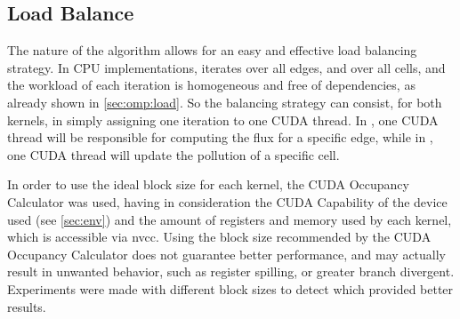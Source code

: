 \subsection{Load Balance}
\label{subsec:cuda:load}


The nature of the algorithm allows for an easy and effective load balancing strategy.
In CPU implementations, \computeflux iterates over all edges, and \update over all cells, and the workload of each iteration is homogeneous and free of dependencies, as already shown in \cref{sec:omp:load}.
So the balancing strategy can consist, for both kernels, in simply assigning one iteration to one CUDA thread.
In \computeflux, one CUDA thread will be responsible for computing the flux for a specific edge, while in \update, one CUDA thread will update the pollution of a specific cell.

In order to use the ideal block size for each kernel, the CUDA Occupancy Calculator \cite{cuda_documentation} was used, having in consideration the CUDA Capability of the device used (see \cref{sec:env}) and the amount of registers and memory used by each kernel, which is accessible via nvcc.
Using the block size recommended by the CUDA Occupancy Calculator does not guarantee better performance, and may actually result in unwanted behavior, such as register spilling, or greater branch divergent. Experiments were made with different block sizes to detect which provided better results.

